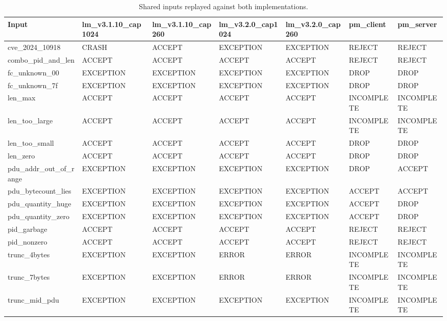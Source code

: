 \begin{table}[t]
\centering\small
\caption{Shared inputs replayed against both implementations.}
\label{tab:replay-shared}
\begin{tabular}{lllllll}
\toprule
Input & lm\_v3.1.10\_cap1024 & lm\_v3.1.10\_cap260 & lm\_v3.2.0\_cap1024 & lm\_v3.2.0\_cap260 & pm\_client & pm\_server \\
\midrule
cve\_2024\_10918 & CRASH & ACCEPT & EXCEPTION & EXCEPTION & REJECT & REJECT \\
combo\_pid\_and\_len & ACCEPT & ACCEPT & ACCEPT & ACCEPT & REJECT & REJECT \\
fc\_unknown\_00 & EXCEPTION & EXCEPTION & EXCEPTION & EXCEPTION & DROP & DROP \\
fc\_unknown\_7f & EXCEPTION & EXCEPTION & EXCEPTION & EXCEPTION & DROP & DROP \\
len\_max & ACCEPT & ACCEPT & ACCEPT & ACCEPT & INCOMPLETE & INCOMPLETE \\
len\_too\_large & ACCEPT & ACCEPT & ACCEPT & ACCEPT & INCOMPLETE & INCOMPLETE \\
len\_too\_small & ACCEPT & ACCEPT & ACCEPT & ACCEPT & DROP & DROP \\
len\_zero & ACCEPT & ACCEPT & ACCEPT & ACCEPT & DROP & DROP \\
pdu\_addr\_out\_of\_range & EXCEPTION & EXCEPTION & EXCEPTION & EXCEPTION & DROP & ACCEPT \\
pdu\_bytecount\_lies & EXCEPTION & EXCEPTION & EXCEPTION & EXCEPTION & ACCEPT & ACCEPT \\
pdu\_quantity\_huge & EXCEPTION & EXCEPTION & EXCEPTION & EXCEPTION & ACCEPT & DROP \\
pdu\_quantity\_zero & EXCEPTION & EXCEPTION & EXCEPTION & EXCEPTION & ACCEPT & DROP \\
pid\_garbage & ACCEPT & ACCEPT & ACCEPT & ACCEPT & REJECT & REJECT \\
pid\_nonzero & ACCEPT & ACCEPT & ACCEPT & ACCEPT & REJECT & REJECT \\
trunc\_4bytes & EXCEPTION & EXCEPTION & ERROR & ERROR & INCOMPLETE & INCOMPLETE \\
trunc\_7bytes & EXCEPTION & EXCEPTION & ERROR & ERROR & INCOMPLETE & INCOMPLETE \\
trunc\_mid\_pdu & EXCEPTION & EXCEPTION & EXCEPTION & EXCEPTION & INCOMPLETE & INCOMPLETE \\
\bottomrule
\end{tabular}
\end{table}
